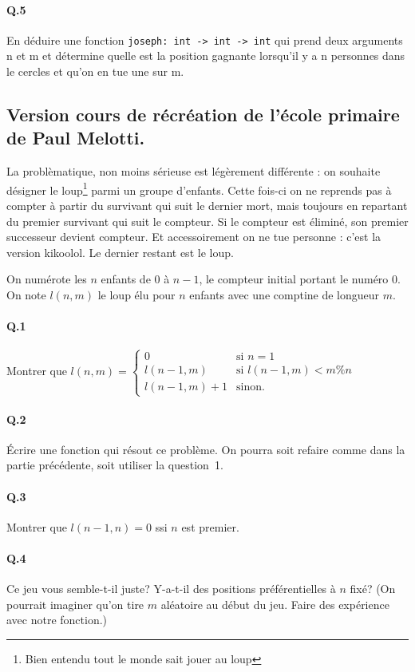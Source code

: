 \documentclass[10pt,a4paper]{article}
\begin{document}
\paragraph{Q.5} En déduire une fonction \texttt{joseph: int -> int -> int} qui prend deux arguments n et m et détermine quelle est la position gagnante
lorsqu'il y a n personnes dans le cercles et qu'on en tue une sur m.


\subsection{Version cours de récréation de l'école primaire de Paul Melotti.}
La problèmatique, non moins sérieuse est légèrement différente : on souhaite désigner le loup\footnote{Bien entendu tout le monde sait jouer au loup} parmi un groupe d'enfants.
Cette fois-ci on ne reprends pas à compter à partir du survivant qui suit le dernier mort, mais toujours en repartant du premier survivant qui suit le compteur. Si le compteur est éliminé, son premier successeur devient compteur.
Et accessoirement on ne tue personne : c'est la version kikoolol. Le dernier restant est le loup.

On numérote les $n$ enfants de $0$ à $n-1$, le compteur initial portant le numéro $0$. On note $l(n,m)$ le loup élu pour $n$ enfants avec une comptine de longueur $m$.

\paragraph{Q.1} Montrer que $l(n,m) = \left\{
	\begin{array}{ll}
		0  & \mbox{si } n = 1 \\
		l(n-1,m) & \mbox{si } l(n-1,m) < m \% n \\
		l(n-1,m) + 1 & \mbox{sinon}.
	\end{array}
\right. $
\paragraph{Q.2} Écrire une fonction qui résout ce problème. On pourra soit refaire comme dans la partie précédente, soit utiliser la question 1.
\paragraph{Q.3} Montrer que $l(n-1,n) = 0$ ssi $n$ est premier.
\paragraph{Q.4} Ce jeu vous semble-t-il juste? Y-a-t-il des positions préférentielles à $n$ fixé? (On pourrait imaginer qu'on tire $m$ aléatoire au début du jeu. Faire des expérience avec notre fonction.)
\end{document}
